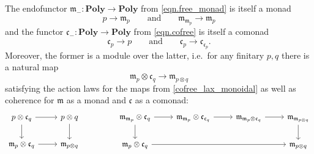 \documentclass[11pt, one side, article]{memoir}
\theoremstyle{definition}
\theoremstyle{plain}
\newcommand{\Cat}[1]{\mathbf{#1}}%
\newcommand{\To}[2][]{\xrightarrow[#1]{#2}}
\newcommand{\smset}{\Cat{Set}}
\newcommand{\yon}{\mathcal{y}}
\newcommand{\poly}{\Cat{Poly}}
\newcommand{\0}{\textsf{0}}
\newcommand{\1}{\tn{\textsf{1}}}
\newcommand{\tri}{\mathbin{\triangleleft}}
\newcommand{\cofree}{\mathfrak{c}}
\newcommand{\free}{\mathfrak{m}}
\newcommand{\qqand}{\qquad\text{and}\qquad}
\begin{document}
The endofunctor $\free_-\colon\poly\to\poly$ from \cref{eqn.free_monad} is itself a monad
\begin{equation}
	p\to\free_p
	\qqand
	\free_{\free_p}\to\free_p
\end{equation}
and the functor $\cofree_-\colon\poly\to\poly$ from \cref{eqn.cofree} is itself a comonad
\begin{equation}
	\cofree_p\to p
	\qqand
	\cofree_p\to\cofree_{\cofree_p}. 
\end{equation}
Moreover, the former is a module over the latter, i.e.\ for any finitary $p,q$ there is a natural map
\begin{equation}\label{module_easy}
  \free_p\otimes\cofree_q\to\free_{p\otimes q}
\end{equation}
satisfying the action laws for the maps from \cref{cofree_lax_monoidal} as well as coherence for $\free$ as a monad and $\cofree$ as a comonad:
\begin{equation}\label{eqn.monad_comonad_coherence}
\begin{tikzcd}
  p\otimes\cofree_q\ar[r]\ar[d]&p\otimes q\ar[d]\\
  \free_p\otimes\cofree_q\ar[r]&\free_{p\otimes q}
\end{tikzcd}
\hspace{.6in}
\begin{tikzcd}
	\free_{\free_p}\otimes\cofree_q\ar[d]\ar[r]&
	\free_{\free_p}\otimes\cofree_{\cofree_q}\ar[r]&
	\free_{\free_p\otimes\cofree_q}\ar[r]&
	\free_{\free_{p\otimes q}}\ar[d]\\
	\free_p\otimes\cofree_q\ar[rrr]&&&
	\free_{p\otimes q}
\end{tikzcd}
\end{equation}
%
%
\end{document}
